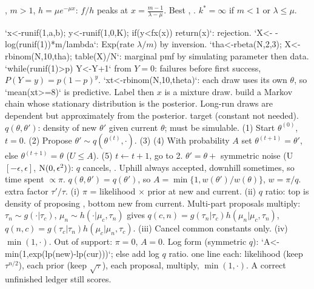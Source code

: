\sk{}, $m>1$, $h=\mu e^{-\mu x}$: $f/h$ peaks at $x=\frac{m-1}{\lambda-\mu}$. Best , . $k^*=\infty$ if $m<1$ or $\lambda\le\mu$.
\bx
{}\par\nobreak
\li`x<-runif(1,a,b); y<-runif(1,0,K); if(y<fx(x)) return(x)`: rejection.
\li`X<- -log(runif(1))*m/lambda`: Exp(rate $\lambda/m$) by inversion.
\li`tha<-rbeta(N,2,3); X<-rbinom(N,10,tha); table(X)/N`: marginal pmf by simulating parameter then data.
\li`while(runif(1)>p) Y<-Y+1` from $Y=0$: failures before first success, $P(Y=y)=p(1-p)^y$.
\li`xt<-rbinom(N,10,theta)`: each draw uses its own $\theta$, so `mean(xt>=8)` is predictive. Label then $x$ is a mixture draw.
 build a Markov chain whose stationary distribution is the posterior. Long-run draws are dependent but approximately from the posterior.
\sk{} target  (constant not needed).  $q(\theta,\theta')$: density of new $\theta'$ given current $\theta$; must be simulable.
\sk(1) Start $\theta^{(0)}$, $t=0$. (2) Propose $\theta'\sim q(\theta^{(t)},\cdot)$. (3)
(4) With probability $A$ set $\theta^{(t+1)}=\theta'$, else $\theta^{(t+1)}=\theta$ ($U\le A$). (5) $t\leftarrow t+1$, go to 2.
\sk{} $\theta'=\theta+$ symmetric noise (U$[-\epsilon,\epsilon]$, $\mathrm{N}(0,\epsilon^2)$): $q$ cancels, . Uphill always accepted, downhill sometimes, so time spent $\propto\pi$.  $q(\theta,\theta')=q(\theta')$, so $A=\min\{1,w(\theta')/w(\theta)\}$, $w=\pi/q$.  extra factor $\tau'/\tau$.
\sk{} (i) $\pi$ = likelihood $\times$ prior at new and current. (ii) $q$ ratio: top is density of proposing , bottom new from current. Multi-part proposals multiply: $\tau_n\sim g(\cdot|\tau_c)$, $\mu_n\sim h(\cdot|\mu_c,\tau_n)$ gives $q(c,n)=g(\tau_n|\tau_c)h(\mu_n|\mu_c,\tau_n)$, $q(n,c)=g(\tau_c|\tau_n)h(\mu_c|\mu_n,\tau_c)$. (iii) Cancel common constants only. (iv) $\min(1,\cdot)$. Out of support: $\pi=0$, $A=0$. Log form (symmetric $q$): `A<-min(1,exp(lp(new)-lp(cur)))`; else add log $q$ ratio.
\sk{} one line each: likelihood (keep $\tau^{n/2}$), each prior (keep $\sqrt\tau$), each proposal, multiply, $\min(1,\cdot)$. A correct unfinished ledger still scores.
